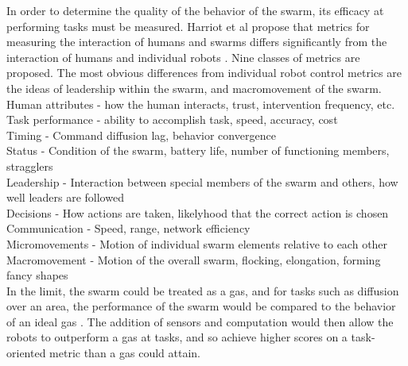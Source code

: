 \documentclass[]{article}
\begin{document}
In order to determine the quality of the behavior of the swarm, its efficacy at performing tasks must be measured. 
Harriot et al propose that metrics for measuring the interaction of humans and swarms differs significantly from the interaction of humans and individual robots \cite{harriott2014biologically}.
Nine classes of metrics are proposed. 
The most obvious differences from individual robot control metrics are the ideas of leadership within the swarm, and macromovement of the swarm. 
Human attributes - how the human interacts, trust, intervention frequency, etc. \\
Task performance - ability to accomplish task, speed, accuracy, cost \\
Timing - Command diffusion lag, behavior convergence \\
Status - Condition of the swarm, battery life, number of functioning members, stragglers \\
Leadership - Interaction between special members of the swarm and others, how well leaders are followed \\
Decisions - How actions are taken, likelyhood that the correct action is chosen \\
Communication - Speed, range, network efficiency \\
Micromovements - Motion of individual swarm elements relative to each other \\
Macromovement - Motion of the overall swarm, flocking, elongation, forming fancy shapes \\ 
In the limit, the swarm could be treated as a gas, and for tasks such as diffusion over an area, the performance of the swarm would be compared to the behavior of an ideal gas \cite{jantz1997kinetics}.
The addition of sensors and computation would then allow the robots to outperform a gas at tasks, and so achieve higher scores on a task-oriented metric than a gas could attain. 
\end{document}
